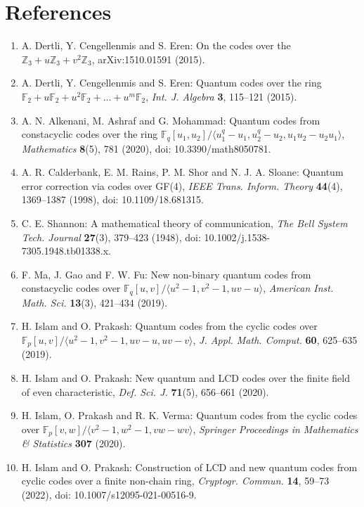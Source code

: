 \documentclass[12pt]{article}
\begin{document}
\section*{References}
\begin{enumerate}
\item A. Dertli, Y. Cengellenmis and S. Eren: On the codes over the $\mathbb{Z}_3 + u\mathbb{Z}_3 + v^2\mathbb{Z}_3$, arXiv:1510.01591 (2015).
\item A. Dertli, Y. Cengellenmis and S. Eren: Quantum codes over the ring $\mathbb{F}_2 + u\mathbb{F}_2 + u^2\mathbb{F}_2 + \dots + u^m\mathbb{F}_2$, \textit{Int. J. Algebra} \textbf{3}, 115--121 (2015).
\item A. N. Alkenani, M. Ashraf and G. Mohammad: Quantum codes from constacyclic codes over the ring $\mathbb{F}_q[u_1,u_2]/\langle u_1^q - u_1, u_2^q - u_2, u_1u_2 - u_2u_1 \rangle$, \textit{Mathematics} \textbf{8}(5), 781 (2020), doi: 10.3390/math8050781.
\item A. R. Calderbank, E. M. Rains, P. M. Shor and N. J. A. Sloane: Quantum error correction via codes over GF(4), \textit{IEEE Trans. Inform. Theory} \textbf{44}(4), 1369--1387 (1998), doi: 10.1109/18.681315.
\item C. E. Shannon: A mathematical theory of communication, \textit{The Bell System Tech. Journal} \textbf{27}(3), 379--423 (1948), doi: 10.1002/j.1538-7305.1948.tb01338.x.
\item F. Ma, J. Gao and F. W. Fu: New non-binary quantum codes from constacyclic codes over $\mathbb{F}_q[u,v]/\langle u^2 - 1, v^2 - 1, uv - u \rangle$, \textit{American Inst. Math. Sci.} \textbf{13}(3), 421--434 (2019).
\item H. Islam and O. Prakash: Quantum codes from the cyclic codes over $\mathbb{F}_p[u,v]/\langle u^2 - 1, v^2 - 1, uv - u, uv - v \rangle$, \textit{J. Appl. Math. Comput.} \textbf{60}, 625--635 (2019).
\item H. Islam and O. Prakash: New quantum and LCD codes over the finite field of even characteristic, \textit{Def. Sci. J.} \textbf{71}(5), 656--661 (2020).
\item H. Islam, O. Prakash and R. K. Verma: Quantum codes from the cyclic codes over $\mathbb{F}_p[v,w]/\langle v^2 - 1, w^2 - 1, vw - wv \rangle$, \textit{Springer Proceedings in Mathematics \& Statistics} \textbf{307} (2020).
\item H. Islam and O. Prakash: Construction of LCD and new quantum codes from cyclic codes over a finite non-chain ring, \textit{Cryptogr. Commun.} \textbf{14}, 59--73 (2022), doi: 10.1007/s12095-021-00516-9.

\end{enumerate}
\end{document}
